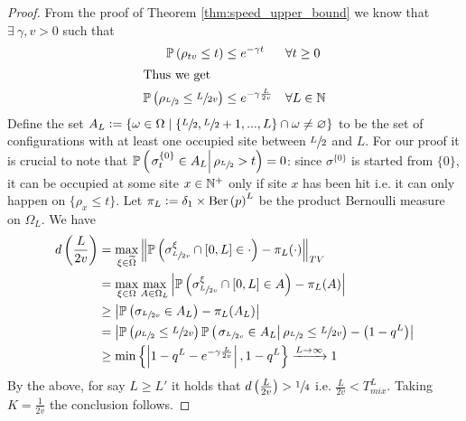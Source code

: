 \begin{proof}
From the proof of Theorem \ref{thm:speed_upper_bound} we know that $\exists\ \gamma, v > 0$ such that 
\begin{align}
\mathbb{P} \left( \rho_{tv} \leq t \right) &\leq e^{- \gamma t} &&\forall t \geq 0 \\
\intertext{Thus we get}
\mathbb{P} \left( \rho_{\sfrac{L}{2}} \leq \sfrac{L}{2v} \right) &\leq e^{- \gamma \frac{L}{2v}} &&\forall L \in \mathbb{N}
\end{align}
Define the set $A_L \vcentcolon= \{\omega \in \Omega \mid \{\sfrac{L}{2}, \sfrac{L}{2} + 1, ..., L\} \cap \omega \neq \varnothing\}$ to be the set of configurations with at least one occupied site between $\sfrac{L}{2}$ and $L$. For our proof it is crucial to note that $\mathbb{P} \left( \left. \sigma^{\{0\}}_t \in A_L \right| \rho_{\sfrac{L}{2}} > t \right) = 0$: since $\sigma^{\{0\}}$ is started from $\{0\}$, it can be occupied at some site $x \in \mathbb{N}^+$ only if site $x$ has been hit i.e. it can only happen on $\{ \rho_x \leq t \}$. Let $\pi_L \vcentcolon= \delta_1 \times \text{Ber} \left( p \right)^L$ be the product Bernoulli measure on $\Omega_L$. We have
\begin{align*}
d\left(\frac{L}{2v}\right) &= \max\limits_{\xi \in \widetilde{\Omega}} \left\Vert \mathbb{P} \left( \sigma^\xi_{\sfrac{L}{2v}} \cap [0,L] \in \cdot \right) - \pi_L(\cdot)								   \right\Vert_{TV} \\
						   &= \max\limits_{\xi \in \Omega} \max\limits_{A \in \Omega_L} \left| \mathbb{P} \left( \sigma^\xi_{\sfrac{L}{2v}} \cap [0,L] \in A \right) - \pi_L(A) \right|\\
						   &\geq \left| \mathbb{P} \left( \sigma_{\sfrac{L}{2v}} \in A_L \right) - \pi_L(A_L) \right| \\
						   &= \left| \mathbb{P} \left( \rho_{\sfrac{L}{2}} \leq \sfrac{L}{2v} \right)\mathbb{P} \left( \left. \sigma_{\sfrac{L}{2v}} \in A_L \right| \rho_{\sfrac{L}{2}} \leq \sfrac{L}{2v} \right)  - \left( 1 - q^L \right) \right| \\
						   &\geq \min\left\{ \left| 1 - q^L - e^{- \gamma \frac{L}{2v}} \right|,  1 - q^L\right\} \xrightarrow{L \rightarrow \infty} 1
\end{align*}
By the above, for say $L \geq L'$ it holds that $d\left(\frac{L}{2v}\right) > \sfrac{1}{4}$ i.e. $\frac{L}{2v} < T^L_{mix}$. Taking $K = \frac{1}{2v}$ the conclusion follows. 
\end{proof}



